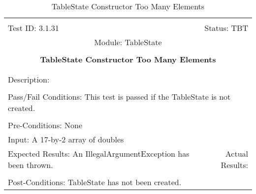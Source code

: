 \documentclass[titlepage]{article}
\begin{document}
\begin{center}%
\begin{table}
\begin{tabular}{|l r|}\hline&\\[-2mm]
	Test ID: 3.1.31	&Status: TBT\\[-3mm]
	\multicolumn{2}{|c|}{Module: TableState}\\&\\
	\multicolumn{2}{|c|}{\textbf{\large{TableState Constructor Too Many Elements}}}\\&\\\hline&\\[-3mm]
	\multicolumn{2}{|p{\textwidth}|}{Description: }\\[1mm]\hline&\\[-3mm]
	\multicolumn{2}{|p{\textwidth}|}{Pass/Fail Conditions: This test is passed if the TableState is not created.}\\[1mm]\hline&\\[-3mm]
	\multicolumn{2}{|p{\textwidth}|}{Pre-Conditions: None}\\[4mm]
	\multicolumn{2}{|p{\textwidth}|}{Input: A 17-by-2 array of doubles}\\[2mm]\hline
	\multicolumn{1}{|p{0.49\textwidth}}{Expected Results: An IllegalArgumentException has been thrown.}	&\multicolumn{1}{|p{0.45\textwidth}|}{Actual Results: }\\\hline&\\[-3mm]
	\multicolumn{2}{|p{\textwidth}|}{Post-Conditions: TableState has not been created.}\\\hline
\end{tabular}
\caption{TableState Constructor Too Many Elements}
\end{table}
\end{center}
\end{document}
